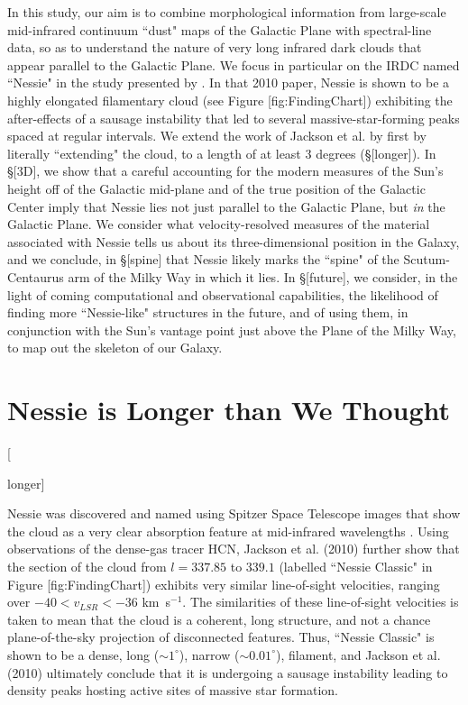 \documentclass[]{article}
\begin{document}
In this study, our aim is to combine morphological information from
large-scale mid-infrared continuum ``dust" maps of the Galactic Plane
with spectral-line data, so as to understand the nature of very long
infrared dark clouds that appear parallel to the Galactic Plane. We
focus in particular on the IRDC named ``Nessie" in the study presented
by \citet{Jackson2010}. In that 2010 paper, Nessie is shown to be a
highly elongated filamentary cloud (see Figure {[}fig:FindingChart{]})
exhibiting the after-effects of a sausage instability that led to
several massive-star-forming peaks spaced at regular intervals. We
extend the work of Jackson et al. by first by literally ``extending" the
cloud, to a length of at least 3 degrees (§{[}longer{]}). In §{[}3D{]},
we show that a careful accounting for the modern measures of the Sun's
height off of the Galactic mid-plane and of the true position of the
Galactic Center imply that Nessie lies not just parallel to the Galactic
Plane, but \emph{in} the Galactic Plane. We consider what
velocity-resolved measures of the material associated with Nessie tells
us about its three-dimensional position in the Galaxy, and we conclude,
in §{[}spine{]} that Nessie likely marks the ``spine" of the
Scutum-Centaurus arm of the Milky Way in which it lies. In
§{[}future{]}, we consider, in the light of coming computational and
observational capabilities, the likelihood of finding more
``Nessie-like" structures in the future, and of using them, in
conjunction with the Sun's vantage point just above the Plane of the
Milky Way, to map out the skeleton of our Galaxy.

\section{Nessie is Longer than We Thought}

{[}

longer{]}

Nessie was discovered and named using Spitzer Space Telescope images
that show the cloud as a very clear absorption feature at mid-infrared
wavelengths \cite{Jackson2010}. Using observations of the dense-gas
tracer HCN, Jackson et al. (2010) further show that the section of the
cloud from $l=337.85$ to $339.1$ (labelled ``Nessie Classic" in Figure
{[}fig:FindingChart{]}) exhibits very similar line-of-sight velocities,
ranging over $-40<v_{LSR}<-36$ km~s$^{-1}$. The similarities of these
line-of-sight velocities is taken to mean that the cloud is a coherent,
long structure, and not a chance plane-of-the-sky projection of
disconnected features. Thus, ``Nessie Classic" is shown to be a dense,
long ($\sim 1^\circ$), narrow ($\sim 0.01^\circ$), filament, and Jackson
et al. (2010) ultimately conclude that it is undergoing a sausage
instability leading to density peaks hosting active sites of massive
star formation.
\end{document}
